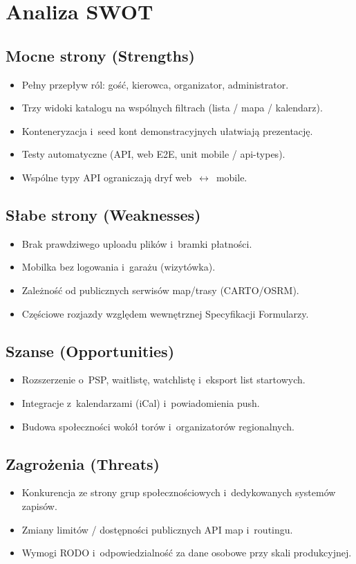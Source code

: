 \documentclass{sprz}
\begin{document}
\chapter{Analiza SWOT}
\section{Mocne strony (Strengths)}
\begin{itemize}
  \item Pełny przepływ ról: gość, kierowca, organizator, administrator.
  \item Trzy widoki katalogu na wspólnych filtrach (lista / mapa / kalendarz).
  \item Konteneryzacja i~seed kont demonstracyjnych ułatwiają prezentację.
  \item Testy automatyczne (API, web E2E, unit mobile / api-types).
  \item Wspólne typy API ograniczają dryf web~$\leftrightarrow$~mobile.
\end{itemize}

\section{Słabe strony (Weaknesses)}
\begin{itemize}
  \item Brak prawdziwego uploadu plików i~bramki płatności.
  \item Mobilka bez logowania i~garażu (wizytówka).
  \item Zależność od publicznych serwisów map/trasy (CARTO/OSRM).
  \item Częściowe rozjazdy względem wewnętrznej Specyfikacji Formularzy.
\end{itemize}

\section{Szanse (Opportunities)}
\begin{itemize}
  \item Rozszerzenie o~PSP, waitlistę, watchlistę i~eksport list startowych.
  \item Integracje z~kalendarzami (iCal) i~powiadomienia push.
  \item Budowa społeczności wokół torów i~organizatorów regionalnych.
\end{itemize}

\section{Zagrożenia (Threats)}
\begin{itemize}
  \item Konkurencja ze strony grup społecznościowych i~dedykowanych systemów zapisów.
  \item Zmiany limitów / dostępności publicznych API map i~routingu.
  \item Wymogi RODO i~odpowiedzialność za dane osobowe przy skali produkcyjnej.
\end{itemize}
\end{document}
